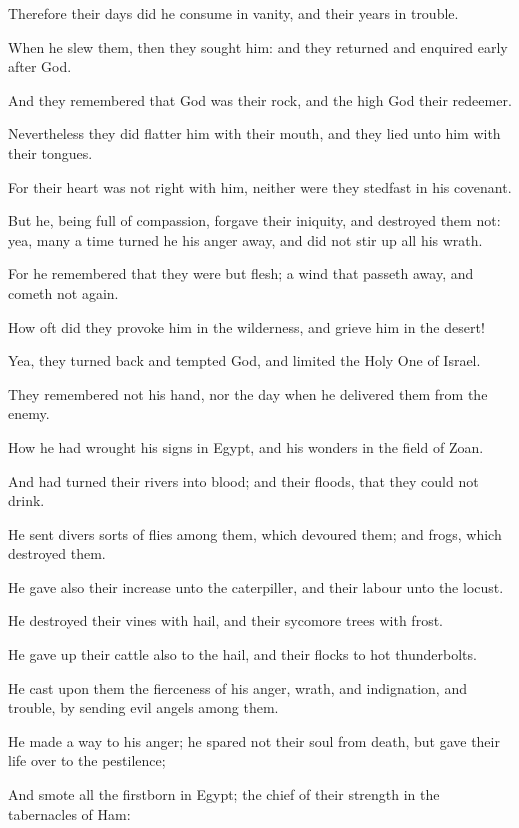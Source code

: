 \verse Therefore their days did he consume in vanity, and their years in trouble.

\verse When he slew them, then they sought him: and they returned and enquired early after God.

\verse And they remembered that God was their rock, and the high God their redeemer.

\verse Nevertheless they did flatter him with their mouth, and they lied unto him with their tongues.

\verse For their heart was not right with him, neither were they stedfast in his covenant.

\verse But he, being full of compassion, forgave their iniquity, and destroyed them not: yea, many a time turned he his anger away, and did not stir up all his wrath.

\verse For he remembered that they were but flesh; a wind that passeth away, and cometh not again.

\verse How oft did they provoke him in the wilderness, and grieve him in the desert!

\verse Yea, they turned back and tempted God, and limited the Holy One of Israel.

\verse They remembered not his hand, nor the day when he delivered them from the enemy.

\verse How he had wrought his signs in Egypt, and his wonders in the field of Zoan.

\verse And had turned their rivers into blood; and their floods, that they could not drink.

\verse He sent divers sorts of flies among them, which devoured them; and frogs, which destroyed them.

\verse He gave also their increase unto the caterpiller, and their labour unto the locust.

\verse He destroyed their vines with hail, and their sycomore trees with frost.

\verse He gave up their cattle also to the hail, and their flocks to hot thunderbolts.

\verse He cast upon them the fierceness of his anger, wrath, and indignation, and trouble, by sending evil angels among them.

\verse He made a way to his anger; he spared not their soul from death, but gave their life over to the pestilence;

\verse And smote all the firstborn in Egypt; the chief of their strength in the tabernacles of Ham:

